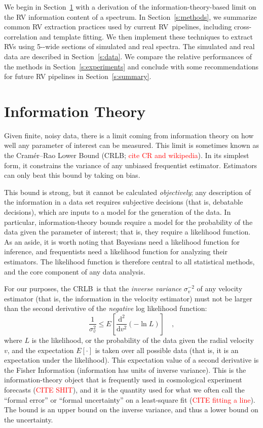 \documentclass[modern]{aastex62}
\newcommand{\ang}{\text{\normalfont\AA}}
\newcommand{\dd}{\mathrm{d}}
\newcommand{\sectionname}{Section}
\newcommand{\todo}[1]{\textcolor{red}{#1}}  %
\newcommand{\acronym}[1]{{\small{#1}}}
\newcommand{\RV}{\acronym{RV}}
\newcommand{\CRLB}{\acronym{CRLB}}
\begin{document}
We begin in \sectionname~\ref{s:info} with a derivation of the information-theory-based limit on the RV information content of a spectrum. 
In \sectionname~\ref{s:methods}, we summarize common RV extraction practices used by current \RV\ pipelines, including cross-correlation and template fitting. 
We then implement these techniques to extract \RV s using 5-\ang-wide sections of simulated and real spectra.
The simulated and real data are described in \sectionname~\ref{s:data}. 
We compare the relative performances of the methods in \sectionname~\ref{s:experiments} and conclude with some recommendations for future RV pipelines in \sectionname~\ref{s:summary}. 

\section{Information Theory}
\label{s:info}

Given finite, noisy data, there is a limit coming from information
theory on how well any parameter of interest can be measured.
This limit is
sometimes known as the Cram\'er--Rao Lower Bound (\CRLB; \todo{cite CR and wikipedia}).
In its simplest form, it constrains the variance of any unbiased
frequentist estimator.
Estimators can only beat this bound by taking on bias.

This bound is strong, but it cannot be calculated \emph{objectively};
any description of the information in a data set requires
subjective decisions (that is, debatable decisions), which are inputs
to a model for the generation of the data.
In particular, information-theory bounds require a model for the
probability of the data given the parameter of interest; that is, they
require a likelihood function.
As an aside, it is worth noting that
Bayesians need a likelihood function for inference, and
frequentists need a likelihood function for analyzing their estimators.
The likelihood function is therefore central to all statistical methods,
and the core component of any data analysis.

For our purposes, the \CRLB\ is that the \emph{inverse variance} $\sigma_v^{-2}$ of any velocity
estimator (that is, the information in the velocity estimator) must not be larger than the
second derivative of the \emph{negative} log likelihood function:
\begin{equation}
\frac{1}{\sigma_v^2} \leq E\left[\frac{\dd^2}{\dd v^2}(-\ln L)\right] \quad,
\end{equation}
where $L$ is the likelihood, or the probability of the data given the radial velocity $v$,
and the expectation $E[\cdot]$ is taken over all possible data (that is, it is an
expectation under the likelihood).
This expectation value of a second derivative is the Fisher Information
(information has units of inverse variance).
This is the information-theory object that is frequently used in
cosmological experiment forecasts (\todo{CITE SHIT}),
and it is the quantity used for what we often call the ``formal error'' or
``formal uncertainty'' on a least-square fit (\todo{CITE fitting a line}).
The bound is an upper bound on the inverse variance, and thus a lower bound
on the uncertainty.
\end{document}

